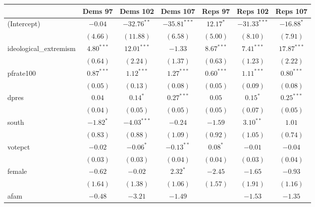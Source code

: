 \documentclass[12pt]{article}
\begin{document}
\begin{table}
	\begin{center}
		\begin{tabular}{l c c c c c c }
			\hline
			& Dems 97 & Dems 102 & Dems 107 & Reps 97 & Reps 102 & Reps 107 \\
			\hline
            (Intercept)            & $-0.04$      & $-32.76^{**}$ & $-35.81^{***}$ & $12.17^{*}$  & $-31.33^{***}$ & $-16.88^{*}$  \\
            & $(4.66)$     & $(11.88)$     & $(6.58)$       & $(5.00)$     & $(8.10)$       & $(7.91)$      \\
            ideological\_extremism & $4.80^{***}$ & $12.01^{***}$ & $-1.33$        & $8.67^{***}$ & $7.41^{***}$   & $17.87^{***}$ \\
            & $(0.64)$     & $(2.24)$      & $(1.37)$       & $(0.63)$     & $(1.23)$       & $(2.22)$      \\
            pfrate100              & $0.87^{***}$ & $1.12^{***}$  & $1.27^{***}$   & $0.60^{***}$ & $1.11^{***}$   & $0.80^{***}$  \\
            & $(0.05)$     & $(0.13)$      & $(0.08)$       & $(0.05)$     & $(0.09)$       & $(0.08)$      \\
            dpres                  & $0.04$       & $0.14^{*}$    & $0.27^{***}$   & $0.05$       & $0.15^{*}$     & $0.25^{***}$  \\
            & $(0.04)$     & $(0.05)$      & $(0.05)$       & $(0.05)$     & $(0.07)$       & $(0.05)$      \\
            south                  & $-1.82^{*}$  & $-4.03^{***}$ & $-0.24$        & $-1.59$      & $3.10^{**}$    & $1.01$        \\
            & $(0.83)$     & $(0.88)$      & $(1.09)$       & $(0.92)$     & $(1.05)$       & $(0.74)$      \\
            votepct                & $-0.02$      & $-0.06^{*}$   & $-0.13^{**}$   & $0.08^{*}$   & $-0.01$        & $-0.04$       \\
            & $(0.03)$     & $(0.03)$      & $(0.04)$       & $(0.04)$     & $(0.03)$       & $(0.04)$      \\
            female                 & $-0.62$      & $-0.02$       & $2.32^{*}$     & $-2.45$      & $-1.65$        & $-0.93$       \\
            & $(1.64)$     & $(1.38)$      & $(1.06)$       & $(1.57)$     & $(1.91)$       & $(1.16)$      \\
            afam                   & $-0.48$      & $-3.21$       & $-1.49$        &              & $-1.53$        & $-1.35$       \\

\end{tabular}
\end{center}
\end{table}
\end{document}

